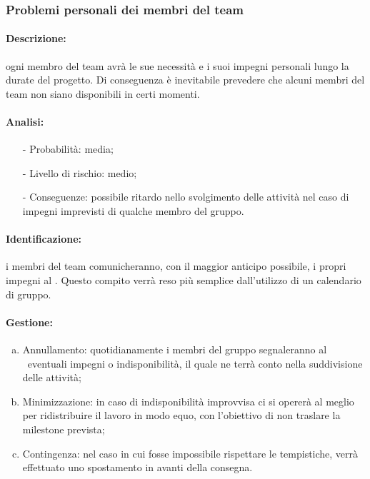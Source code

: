 \documentclass[../PianoProgetto.tex]{subfiles}
\begin{document}
\subsubsection{Problemi personali dei membri del team}

	\paragraph*{Descrizione:} ogni membro del team avrà le sue necessità e i suoi impegni personali lungo la durate del progetto. Di conseguenza è inevitabile prevedere che alcuni membri del team non siano disponibili in certi momenti.
	 
	\paragraph*{Analisi:}
	\begin{itemize}
		\item[-] Probabilità: media;
		\item[-] Livello di rischio: medio;
		\item[-] Conseguenze: possibile ritardo nello svolgimento delle attività nel caso di impegni imprevisti di qualche membro del gruppo.
	\end{itemize}	
		
	\paragraph*{Identificazione:} i membri del team comunicheranno, con il maggior anticipo possibile, i propri impegni al \responsabilediprogetto . Questo compito verrà reso più semplice dall'utilizzo di un calendario di gruppo. 
	
	\paragraph*{Gestione:}
	\begin{enumerate}[(a)]
		\item Annullamento: quotidianamente i membri del gruppo segnaleranno al \responsabilediprogetto\ eventuali impegni o indisponibilità, il quale ne terrà conto nella suddivisione delle attività;
		\item Minimizzazione: in caso di indisponibilità improvvisa ci si opererà al meglio per ridistribuire il lavoro in modo equo, con l'obiettivo di non traslare la milestone prevista;
		\item  Contingenza: nel caso in cui fosse impossibile rispettare le tempistiche, verrà effettuato uno spostamento in avanti della consegna.
	\end{enumerate}
			
\end{document}
